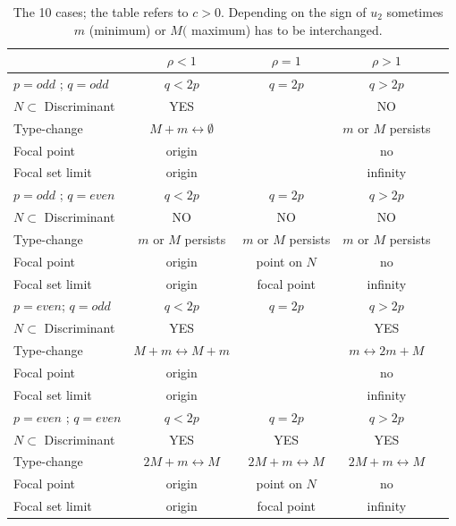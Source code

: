 \documentclass[12pt,a4,twoside]{amsart}
\newtheorem*{main lemma}{The main lemma}
\begin{document}
\begin{table}[ht]
\centering
\begin{tabular}{|l|c|c|c|c|}
\hline
    & $\rho < 1$      &  $\rho = 1$    &  $\rho > 1$  \\
\hline
 $p = odd$ ; $q= odd$       & $q < 2p$ & $q=2p$ & $ q> 2p$\\
\hline
$N \subset$ Discriminant &  YES  & &  NO  \\
Type-change & $M + m \leftrightarrow \emptyset$ &  &  $m$ or $M$ persists\\
Focal point    & origin &   & no\\
Focal set limit & origin &  & infinity \\
\hline
 $p = odd$ ; $q= even$       & $q < 2p$  &   $q=2p$   & $ q> 2p$\\
\hline
$N \subset$ Discriminant & NO & NO  & NO  \\
Type-change & $m$ or $M$ persists &  $m$ or $M$ persists  &   $m$ or $M$ persists\\
Focal point    & origin &  point on $N$  & no\\
Focal set limit & origin & focal point & infinity \\
\hline
 $p = even$; $q =odd$       & $q < 2p$  &   $q=2p$ & $ q> 2p$\\
\hline
$N \subset$ Discriminant &  YES  &  & YES \\
Type-change & $M + m \leftrightarrow M+m$ &   &   $m \leftrightarrow 2m+M $ \\
Focal point    & origin &   & no\\
Focal set limit & origin &  & infinity \\
\hline
 $p = even$ ; $q= even $      & $q < 2p$   &   $q=2p$   & $ q> 2p$\\
\hline
$N \subset$  Discriminant & YES & YES & YES\\
Type-change & $2M + m \leftrightarrow M$ &  $2M + m \leftrightarrow M $   &   $2M + m \leftrightarrow M $ \\
Focal point    & origin & point on $N$ & no\\
Focal set limit & origin & focal point & infinity \\
\hline
\end{tabular}
\caption{The 10 cases; the table refers to $c > 0$. Depending on the sign of $u_2$ sometimes $m$ (minimum) or $M($ maximum) has to be interchanged.}
\label{table:10cases}
\end{table}
\end{document}
